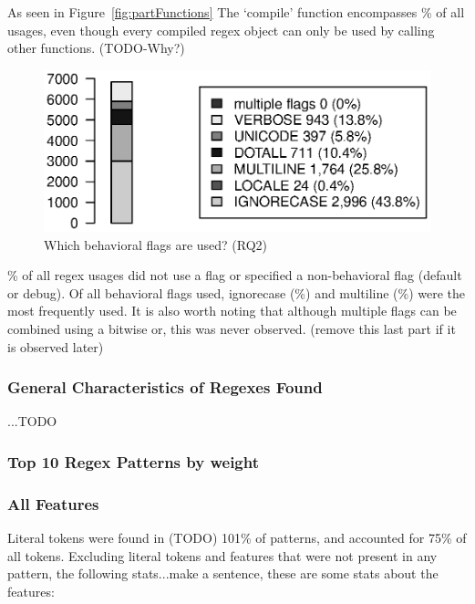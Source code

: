 As seen in Figure~\ref{fig:partFunctions} The `compile' function encompasses \% of all usages, even though every compiled regex object can only be used by calling other functions.  (TODO-Why?)

\begin{figure}[htb]
\centering
\includegraphics[width=\columnwidth]{../analysis_output/partFlags.eps}
\caption{Which behavioral flags are used? (RQ2)}
\label{fig:digraph}
\end{figure}

\% of all regex usages did not use a flag or specified a non-behavioral flag (default or debug).  Of all behavioral flags used, ignorecase (\%) and multiline (\%) were the most frequently used.  It is also worth noting that although multiple flags can be combined using a bitwise or, this was never observed. (remove this last part if it is observed later)

\subsubsection{{General Characteristics of Regexes Found}}

...TODO

\subsubsection{{Top 10 Regex Patterns by weight}}




\subsubsection{All Features}

Literal tokens were found in (TODO) 101\% of patterns, and accounted for 75\% of all tokens.  Excluding literal tokens and features that were not present in any pattern, the following stats...make a sentence, these are some stats about the features:

